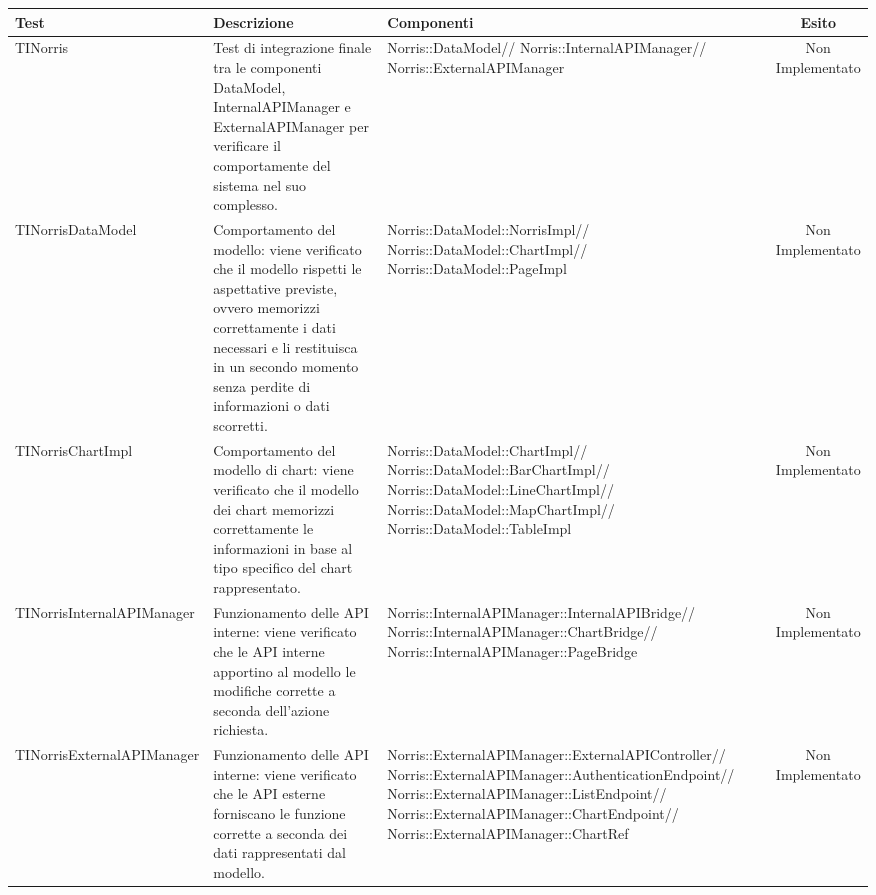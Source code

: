 \begin{table}[H]
	\begin{center}
		\begin{tabu}{| l | l | l | c |}
			\hline
			Test 					& Descrizione				& Componenti				 & Esito 					\\ \hline




	TINorris
	&
Test di integrazione finale tra le componenti DataModel, InternalAPIManager e ExternalAPIManager per verificare il comportamente del sistema nel suo complesso.
& \parbox[t]{0.4\textwidth}{
Norris::DataModel//
Norris::InternalAPIManager//
Norris::ExternalAPIManager}
			& Non Implementato
			\\ \hline



	TINorrisDataModel
	&
Comportamento del modello: viene verificato che il modello rispetti le aspettative previste, ovvero memorizzi correttamente i dati necessari e li restituisca in un secondo momento senza perdite di informazioni o dati scorretti.
& \parbox[t]{0.4\textwidth}{
Norris::DataModel::NorrisImpl//
Norris::DataModel::ChartImpl//
Norris::DataModel::PageImpl}
			& Non Implementato
			\\ \hline



	TINorrisChartImpl
	&
Comportamento del modello di chart: viene verificato che il modello dei chart memorizzi correttamente le informazioni in base al tipo specifico del chart rappresentato.
& \parbox[t]{0.4\textwidth}{
Norris::DataModel::ChartImpl//
Norris::DataModel::BarChartImpl//
Norris::DataModel::LineChartImpl//
Norris::DataModel::MapChartImpl//
Norris::DataModel::TableImpl}
			& Non Implementato
			\\ \hline



	TINorrisInternalAPIManager
	&
Funzionamento delle API interne: viene verificato che le API interne apportino al modello le modifiche corrette a seconda dell'azione richiesta.
& \parbox[t]{0.4\textwidth}{
Norris::InternalAPIManager::InternalAPIBridge//
Norris::InternalAPIManager::ChartBridge//
Norris::InternalAPIManager::PageBridge}
			& Non Implementato
			\\ \hline



	TINorrisExternalAPIManager
	&
Funzionamento delle API interne: viene verificato che le API esterne forniscano le funzione corrette a seconda dei dati rappresentati dal modello.
& \parbox[t]{0.4\textwidth}{
Norris::ExternalAPIManager::ExternalAPIController//
Norris::ExternalAPIManager::AuthenticationEndpoint//
Norris::ExternalAPIManager::ListEndpoint//
Norris::ExternalAPIManager::ChartEndpoint//
Norris::ExternalAPIManager::ChartRef}
			& Non Implementato
			\\ \hline










\end{tabu}
\end{center}
\end{table}
